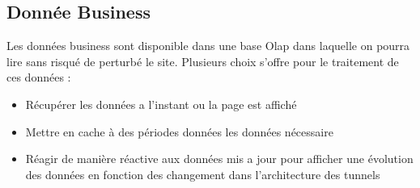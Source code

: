 \subsection{Donnée Business}
Les données business sont disponible dans une base Olap dans laquelle on pourra lire sans risqué de perturbé le site. Plusieurs choix s'offre pour le traitement de ces données :

\begin{itemize}
\item Récupérer les données a l’instant ou la page est affiché 
\item Mettre en cache à des périodes données les données nécessaire
\item Réagir de manière réactive aux données mis a jour pour afficher une évolution des données en fonction des changement dans l’architecture des tunnels
\end{itemize}